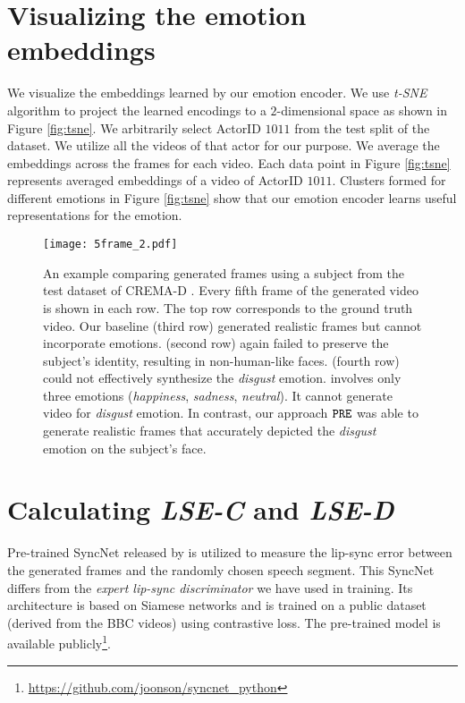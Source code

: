 \documentclass[accepted]{uai2023}
\begin{document}
\section{Visualizing the emotion embeddings}
We visualize the embeddings learned by our emotion encoder. We use \emph{t-SNE} \citep{van2008visualizing} algorithm to project the learned encodings to a $2$-dimensional space as shown in Figure \ref{fig:tsne}. We arbitrarily select ActorID $1011$ from the test split of the \citep{cao2014crema} dataset. We utilize all the videos of that actor for our purpose. We average the embeddings across the frames for each video. Each data point in Figure \ref{fig:tsne} represents averaged embeddings of a video of ActorID $1011$. Clusters formed for different emotions in Figure \ref{fig:tsne} show that our emotion encoder learns useful representations for the emotion.

\begin{figure*}[htp]
\texttt{[image: 5frame\_2.pdf]}
\caption{An example comparing generated frames using a subject from the test dataset of CREMA-D \citep{cao2014crema}. Every fifth frame of the generated video is shown in each row. The top row corresponds to the ground truth video. Our baseline \citep{prajwal2020lip} (third row) generated realistic frames but cannot incorporate emotions. \citet{wang2021audio2head} (second row) again failed to preserve the subject's identity, resulting in non-human-like faces. \cite{9496264} (fourth row) could not effectively synthesize the \emph{disgust} emotion. \citet{magnusson2021invertable} involves only three emotions (\emph{happiness}, \emph{sadness}, \emph{neutral}). It cannot generate video for \emph{disgust} emotion.
In contrast, our approach {${\tt PRE}$} was able to generate realistic frames that accurately depicted the \emph{disgust} emotion on the subject's face.}
\label{fig:cmp2}
\end{figure*}

\section{Calculating \emph{LSE-C} and \emph{LSE-D}}
Pre-trained SyncNet released by \citep{chung2016out} is utilized to measure the lip-sync error between the generated frames and the randomly chosen speech segment. This SyncNet differs from the \emph{expert lip-sync discriminator} we have used in training. Its architecture is based on Siamese networks \citep{1467314} and is trained on a public dataset (derived from the BBC videos) using contrastive loss. The pre-trained model is available publicly\footnote{\href{https://github.com/joonson/syncnet_python}{https://github.com/joonson/syncnet\_python}}.
\end{document}
